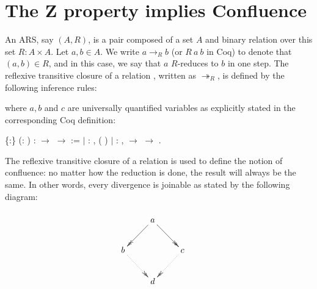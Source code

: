 \documentclass[a4paper]{article}
\newcommand{\tto}{\twoheadrightarrow}
\begin{document}
\section{The Z property implies Confluence}

An ARS, say $(A,R)$, is a pair composed of a set $A$ and binary
relation over this set $R:A\times A$. Let $a,b\in A$. We write
$a\to_R b$ (or $R\ a\ b$ in Coq) to denote that $(a,b)\in R$, and in
this case, we say that $a$ $R$-reduces to $b$ in one step. The
reflexive transitive closure of a relation , written as
$\tto_R$, is defined by the following inference rules:  \noindent where $a,b$ and $c$ are universally
quantified variables as explicitly stated in the corresponding Coq
definition: \begin{coqdoccode} \coqdocemptyline \coqdocnoindent
   
  \{:\} (: 
  ) :  \ensuremath{\rightarrow}
   \ensuremath{\rightarrow}  :=\coqdoceol
  \coqdocnoindent \ensuremath{|} :
  \coqdockw{\ensuremath{\forall}} ,
  ( ) 
  \coqdoceol \coqdocnoindent \ensuremath{|}
  : \coqdockw{\ensuremath{\forall}} 
   ,  
   \ensuremath{\rightarrow} 
     \ensuremath{\rightarrow}
    
  .\coqdoceol \coqdocemptyline
\end{coqdoccode}

The reflexive transitive closure of a relation is used to define
    the notion of confluence: no matter how the reduction is done, the
    result will always be the same. In other words, every divergence
    is joinable as stated by the following diagram:


    $\centerline{\xymatrix{ & a \ar@{->>}[dl] \ar@{->>}[dr] & \\ b
    \ar@{.>>}[dr] & & c \ar@{.>>}[dl] \\ & d & }}$
\end{document}
